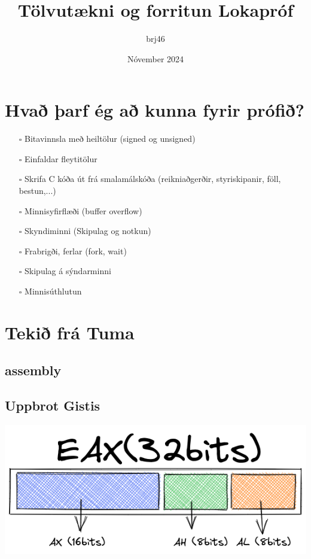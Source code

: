 \documentclass{article}
\title{Tölvutækni og forritun Lokapróf}
\author{brj46 }
\date{Nóvember 2024}
\begin{document}
\maketitle

\newpage

\section{Hvað þarf ég að kunna fyrir prófið?}

\begin{itemize}
    \item[$\square$] Bitavinnsla með heiltölur (signed og unsigned)
    \item[$\square$] Einfaldar fleytitölur
    \item[$\square$] Skrifa C kóða út frá smalamálskóða (reikniaðgerðir, styriskipanir, föll, bestun,...)
    \item[$\square$] Minnisyfirflæði (buffer overflow)
    \item[$\square$] Skyndiminni (Skipulag og notkun)
    \item[$\square$] Frabrigði, ferlar (fork, wait)
    \item[$\square$] Skipulag á sýndarminni
    \item[$\square$] Minnisúthlutun
\end{itemize}


\newpage

\section{Tekið frá Tuma}

\subsection{assembly}



\subsection{Uppbrot Gistis}

\includegraphics[scale = 0.8]{gistabrot.excalidraw.png}
\end{document}
